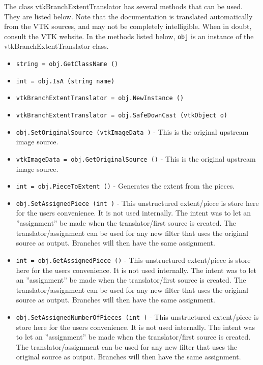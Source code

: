 The class vtkBranchExtentTranslator has several methods that can be used.
  They are listed below.
Note that the documentation is translated automatically from the VTK sources,
and may not be completely intelligible.  When in doubt, consult the VTK website.
In the methods listed below, \verb|obj| is an instance of the vtkBranchExtentTranslator class.
\begin{itemize}
\item  \verb|string = obj.GetClassName ()|

\item  \verb|int = obj.IsA (string name)|

\item  \verb|vtkBranchExtentTranslator = obj.NewInstance ()|

\item  \verb|vtkBranchExtentTranslator = obj.SafeDownCast (vtkObject o)|

\item  \verb|obj.SetOriginalSource (vtkImageData )| -  This is the original upstream image source.

\item  \verb|vtkImageData = obj.GetOriginalSource ()| -  This is the original upstream image source.

\item  \verb|int = obj.PieceToExtent ()| -  Generates the extent from the pieces.

\item  \verb|obj.SetAssignedPiece (int )| -  This unstructured extent/piece is store here for the users convenience.
 It is not used internally.  The intent was to let an ''assignment'' be made
 when the translator/first source is created.  The translator/assignment
 can be used for any new filter that uses the original source as output.
 Branches will then have the same assignment.

\item  \verb|int = obj.GetAssignedPiece ()| -  This unstructured extent/piece is store here for the users convenience.
 It is not used internally.  The intent was to let an ''assignment'' be made
 when the translator/first source is created.  The translator/assignment
 can be used for any new filter that uses the original source as output.
 Branches will then have the same assignment.

\item  \verb|obj.SetAssignedNumberOfPieces (int )| -  This unstructured extent/piece is store here for the users convenience.
 It is not used internally.  The intent was to let an ''assignment'' be made
 when the translator/first source is created.  The translator/assignment
 can be used for any new filter that uses the original source as output.
 Branches will then have the same assignment.


\end{itemize}
